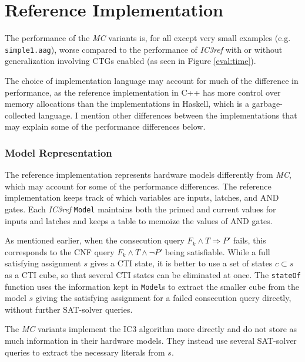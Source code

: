 \documentclass[12pt,a4paper,twoside,openright]{report}
\begin{document}
{{\section{Reference Implementation}
\label{eval:ic3ref}

The performance of the \emph{MC} variants is, for all except very small examples
(e.g. \verb,simple1.aag,),
worse compared to the performance of \emph{IC3ref}
with or without generalization involving CTGs enabled (as seen in Figure \ref{eval:time}).

The choice of implementation language may account for much of the difference in performance, as the reference
implementation in C++ has more control over memory allocations than the implementations in Haskell, which is
a garbage-collected language. I mention other differences between the implementations that may explain
some of the performance differences below.

\subsubsection{Model Representation}
\label{eval:ic3ref:model}
The reference implementation represents hardware models differently from
\emph{MC}, which may account for some of the performance differences.
The reference implementation keeps track of which variables are inputs, latches, and AND gates.
Each \emph{IC3ref} \verb,Model, maintains both the primed and current values for inputs and latches and keeps a
table to memoize the values of AND gates.

As mentioned earlier, when the consecution query $F_k \wedge T \Rightarrow P'$ fails, this corresponds
to the CNF query $F_k \wedge T \wedge \neg P'$ being satisfiable.
While a full satisfying assignment
$s$ gives a CTI state, it is better to use a set of states $c \subset s$ as a CTI cube, so that several
CTI states can be eliminated at once.
The \verb,stateOf, function uses the information kept in \verb,Model,s to extract the smaller
cube from the model $s$ giving the satisfying assignment for a failed consecution query directly,
without further SAT-solver queries.

The \emph{MC} variants implement the IC3 algorithm more directly and do not store as
much information in their hardware
models. They instead use several SAT-solver queries to extract the necessary literals
from $s$.

}}
\end{document}
